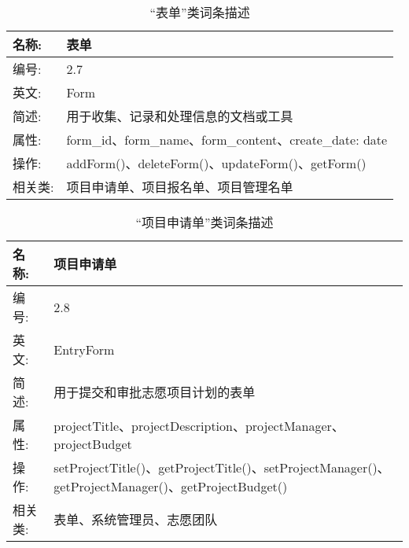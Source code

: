 \begin{table}[H]  
\caption{“表单”类词条描述}  
\begin{center}  
    \begin{tabular}{l p{11cm}} 
        \hline
        \quad 名称:  &  表单 \\
        \hline
        \quad 编号:  & 2.7 \\
        \hline
        \quad 英文:  &  Form \\
        \hline
        \quad 简述:  & 用于收集、记录和处理信息的文档或工具 \\
        \hline
        \quad 属性:  & form\_id、form\_name、form\_content、create\_date: date\\
        \hline
        \quad 操作:  & addForm()、deleteForm()、updateForm()、getForm()\\
        \hline
        \quad 相关类:  & 项目申请单、项目报名单、项目管理名单 \\
        \hline
    \end{tabular}
\end{center}
\end{table}

\begin{table}[H]  
\caption{“项目申请单”类词条描述}  
\begin{center}  
    \begin{tabular}{l p{11cm}} 
        \hline
        \quad 名称:  &  项目申请单 \\
        \hline
        \quad 编号:  & 2.8 \\
        \hline
        \quad 英文:  & EntryForm\\
        \hline
        \quad 简述:  & 用于提交和审批志愿项目计划的表单 \\
        \hline
        \quad 属性:  & projectTitle、projectDescription、projectManager、projectBudget\\
        \hline
        \quad 操作:  & setProjectTitle()、getProjectTitle()、setProjectManager()、getProjectManager()、getProjectBudget()\\
        \hline
        \quad 相关类:  & 表单、系统管理员、志愿团队 \\
        \hline
    \end{tabular}
\end{center}
\end{table}

